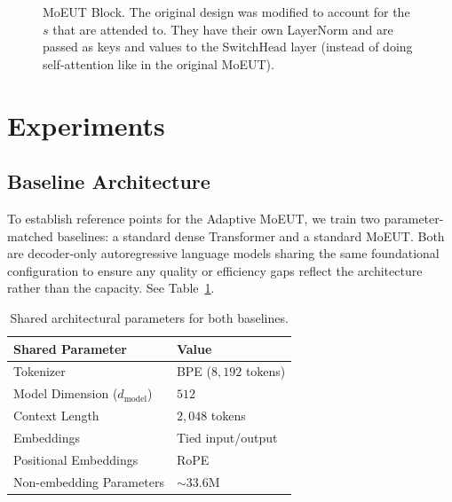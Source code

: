\documentclass[11pt]{article}
\begin{document}
\begin{figure}
\caption{MoEUT Block. The original design was modified to account for the $s$ that are attended to.
They have their own LayerNorm and are passed as keys and values to the SwitchHead layer (instead of doing self-attention like in the original MoEUT).}
\label{fig:moeut-block}
\end{figure}

\section{Experiments}

\subsection{Baseline Architecture}
To establish reference points for the Adaptive MoEUT, we train two parameter-matched baselines: a standard dense Transformer and a standard MoEUT.
Both are decoder-only autoregressive language models sharing the same foundational configuration to ensure any quality or efficiency gaps reflect the architecture rather than the capacity. 
See Table~\ref{tab:shared_params}.
\begin{table}[htbp]
  \centering
  \small
  \begin{tabular}{ll}
    \toprule
    \textbf{Shared Parameter} & \textbf{Value} \\
    \midrule
    Tokenizer & BPE ($8{,}192$ tokens) \\
    Model Dimension ($d_{\text{model}}$) & $512$ \\
    Context Length & $2{,}048$ tokens \\
    Embeddings & Tied input/output \\
    Positional Embeddings & RoPE \\
    Non-embedding Parameters & $\sim 33.6$M \\
    \bottomrule
  \end{tabular}
  \caption{Shared architectural parameters for both baselines.}
  \label{tab:shared_params}
\end{table}
\end{document}
